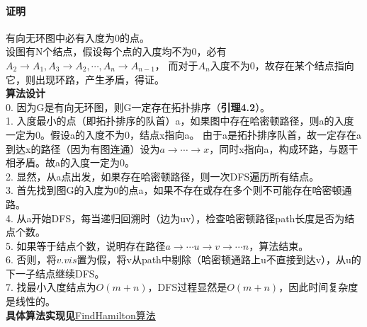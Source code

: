 \documentclass[11pt,a4paper,oneside,oldfontcommands]{ctexart}
\begin{document}
\paragraph{证明 }有向无环图中必有入度为0的点。\\
\hspace*{20pt}设图有N个结点，假设每个点的入度均不为0，必有
$A_{2}\rightarrow A_{1},A_{3}\rightarrow A_{2},\cdots,A_{n}\rightarrow A_{n-1}$，
而对于$A_n$入度不为0，故存在某个结点指向它，则出现环路，产生矛盾，得证。\\
\textbf{算法设计}\\
0. 因为G是有向无环图，则G一定存在拓扑排序（\textbf{引理4.2}）。\\
1. 入度最小的点（即拓扑排序的队首）a，如果图中存在哈密顿路径，则a的入度一定为0。假设a的入度不为0，结点x指向a。
由于a是拓扑排序队首，故一定存在a到达x的路径（因为有图连通）设为$a\rightarrow\cdots\rightarrow x$，同时x指向a，构成环路，与题干相矛盾。故a的入度一定为0。\\
2. 显然，从a点出发，如果存在哈密顿路径，则一次DFS遍历所有结点。\\
3. 首先找到图G的入度为0的点a，如果不存在或存在多个则不可能存在哈密顿通路。\\
4. 从a开始DFS，每当递归回溯时（边为uv），检查哈密顿路径path长度是否为结点个数。\\
5. 如果等于结点个数，说明存在路径$a\rightarrow\cdots u\rightarrow v\rightarrow\cdots n$，算法结束。\\
6. 否则，将$v.vis$置为假，将v从path中剔除（哈密顿通路上u不直接到达v），从u的下一子结点继续DFS。\\
7. 找最小入度结点为$O(m+n)$，DFS过程显然是$O(m+n)$，因此时间复杂度是线性的。\\
\textbf{具体算法实现见}\hyperlink{FindHamilton}{FindHamilton算法}\\
\end{document}
